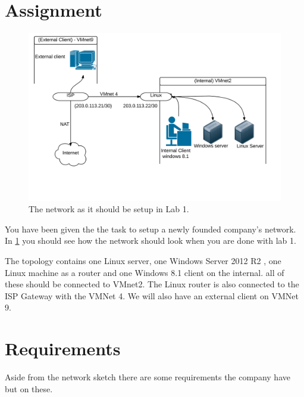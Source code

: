 \documentclass[paper=a4, fontsize=11pt]{report} %
\begin{document}
\section{Assignment}
\begin{figure}[h]
\centering
\includegraphics[width=1\linewidth]{./network}
\caption[Figure over network in Lab 1]{The network as it should be setup in Lab 1.}
\label{fig:network}
\end{figure}
You have been given the the task to setup a newly founded company's network. In \figurename \ref{fig:network} you should see how the network should look when you are done with lab 1.

The topology contains one Linux server, one Windows Server 2012 R2 , one Linux machine as a router and one Windows 8.1 client on the internal. all of these should be connected to VMnet2. The Linux router is also connected to the ISP Gateway with the VMNet 4.
We will also have an external client on VMNet 9.

\section{Requirements}
\label{tasks}
Aside from the network sketch there are some requirements the company have but on these.
\end{document}

